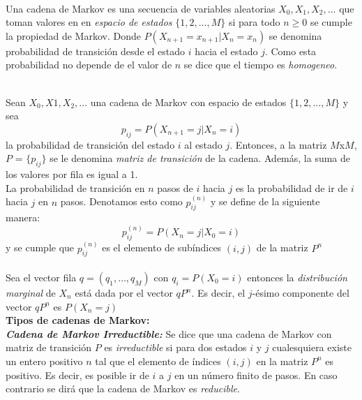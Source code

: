 \documentclass[10pt,a4paper]{article}
\theoremstyle{definition}
\theoremstyle{remark}
\begin{document}
\begin{multicols}{2}
\\
Una cadena de Markov es una secuencia de variables aleatorias $X_{0},X_{1},X_{2},...$ 
que toman valores en en \textit{espacio de estados} $\{1,2,\dots,M\}$ si para todo $n
\geq0$ se cumple la propiedad de Markov. Donde $P(X_{n+1}=x_{n+1}|X_{n}=x_n)$ se 
denomina probabilidad de transición desde el estado $i$ hacia el estado $j$. Como esta 
probabilidad no depende de el valor de $n$ se dice que el tiempo es \textit{homogeneo}.\
\

\\
Sean $X_{0},X{1},X_{2},\dots$ una cadena de Markov con espacio de estados $\{1,2,\dots,M\}$ y sea
\[
p_{ij} = P(X_{n+1}=j|X_{n}=i)
\] 
la probabilidad de transición del estado $i$ al estado $j$. Entonces, a la matriz $M$x$M$, $P$ = $\{p_{ij}\}$ se le denomina \textit{matriz de transición} de la cadena. Además, la suma de los valores por fila es igual a 1.\\

La probabilidad de transición en $n$ pasos de $i$ hacia $j$ es la probabilidad de ir de $i$ hacia $j$ en $n$ pasos. Denotamos esto como $p_{ij}^{(n)}$ y se define de la siguiente manera:
\[
p_{ij}^{(n)} = P(X_{n}=j|X_{0}=i)
\]
y se cumple que $p_{ij}^{(n)}$ es el elemento de subíndices $(i,j)$ de la matriz $P^{n}$\\

\\
Sea el vector fila $q = (q_{1},\dots,q_{M})$ con $q_{i} = P(X_{0} = i)$ entonces la \textit{distribución marginal} de $X_{n}$ está dada por el vector $qP^{n}$. Es decir, el $j$-ésimo componente del vector $qP^{n}$ es $P(X_{n} = j)$\\

\noindent \textbf{Tipos de cadenas de Markov:}\\

\textbf{\textit{Cadena de Markov Irreductible:}}
Se dice que una cadena de Markov con matriz de transición $P$ es \textit{irreductible} si para dos estados $i$ y $j$ cualesquiera existe un entero positivo $n$ tal que el elemento de índices $(i,j)$ en la matriz $P^n$ es positivo. Es decir, es posible ir de $i$ a $j$ en un número finito de pasos. En caso contrario se dirá que la cadena de Markov es \textit{reducible}.\\


\end{multicols}
\end{document}
